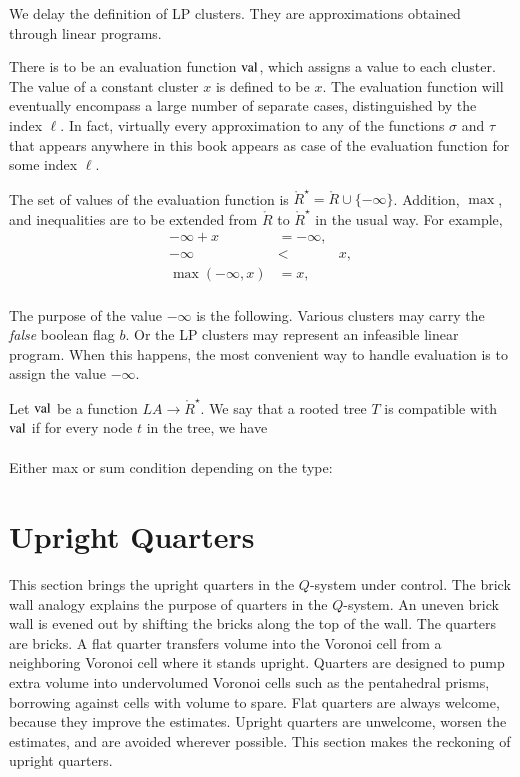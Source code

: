 We delay the definition of LP clusters.  They are approximations
obtained through linear programs.



There is to be an evaluation function ${\operatorname{val}}$, which assigns a value
to each cluster.  The value of a constant cluster $x$ is defined to be $x$.
The evaluation function will eventually encompass a large number of
separate cases, distinguished by the index $\ell$.  
In fact, virtually every approximation
to any of the functions $\sigma$ and $\tau$ that appears anywhere
in this book appears as case of the evaluation function for some index
$\ell$.

The set of values of the evaluation function is 
$\ring{R}^\star = \ring{R}\cup\{-\infty\}$.
Addition, $\max$, and inequalities are to be extended from
$\ring{R}$ to $\ring{R}^\star$ in the usual way.  For example,
  $$
  \begin{array}{lll}
    -\infty + x &= -\infty,\\
    -\infty &< & x,\\
    \max(-\infty,x) &= x,\\
    \end{array}
  $$

The purpose of the value $-\infty$ is the following.  Various
clusters may carry the {\it false} boolean flag $b$.  Or the
LP clusters may represent an infeasible linear program.  When
this happens, the most convenient way to handle evaluation is
to assign the value $-\infty$.

\begin{definition}
Let ${\operatorname{val}}$
be a function $LA\to \ring{R}^\star$.  We say that
a rooted tree $T$ is compatible with ${\operatorname{val}}$ if for every
node $t$ in the tree, we have
   $$
   \begin{array}{lll}
     \end{array}
   $$
\end{definition}

Either max or sum condition depending on the type:






\section{Upright Quarters}


This section brings the upright quarters in the $Q$-system
under control. 
The brick wall analogy explains the purpose of quarters in the
$Q$-system.  An uneven brick wall is evened out by shifting the
bricks along the top of the wall.  The quarters are bricks.  A flat quarter
transfers volume into the Voronoi cell from a neighboring Voronoi
cell where it stands upright.  Quarters are designed to pump extra
volume into undervolumed Voronoi cells such as the pentahedral prisms,
borrowing against cells with volume to spare.  Flat quarters are always
welcome, because they improve the estimates.  Upright quarters are
unwelcome, worsen
the estimates, and are avoided wherever possible. This section
makes the reckoning of upright quarters.

